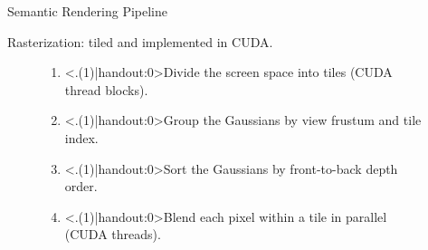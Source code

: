 \begin{Frame}{Semantic Rendering Pipeline }
	\par \alert{Rasterization}: tiled and implemented in CUDA.
	\vspace*{1.5ex}
	\begin{figure}[htbp]
		\begin{minipage}[c]{0.25\linewidth}
			\centering
		\end{minipage}
		\hspace{\fill}
		\begin{minipage}[c]{0.70\linewidth}
			\centering
			\begin{enumerate}[<+(1)->]
				\setlength{\itemsep}{1.5ex}
				\item \alert<.(1)|handout:0>{Divide} the screen space into tiles (CUDA thread blocks).
				\item \alert<.(1)|handout:0>{Group} the Gaussians by view frustum and tile index.
				\item \alert<.(1)|handout:0>{Sort} the Gaussians by front-to-back depth order.
				\item \alert<.(1)|handout:0>{Blend} each pixel within a tile in parallel (CUDA threads).
			\end{enumerate}
		\end{minipage}
	\end{figure}
\end{Frame}

